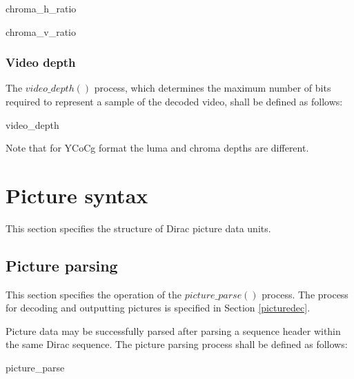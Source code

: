 \begin{pseudo}{chroma\_h\_ratio}{}
\bsRET{\LumaWidth//\ChromaWidth}
\end{pseudo}
 
\begin{pseudo}{chroma\_v\_ratio}{}
\bsRET{\LumaHeight//\ChromaHeight}
\end{pseudo}

\subsubsection{Video depth}
\label{videodepth}
The $video\_depth()$ process, which determines the maximum number of bits required to represent a sample of the decoded video, shall be defined as follows:

\begin{pseudo}{video\_depth}{\VideoParams}
\end{pseudo}

Note that for YCoCg format the luma and chroma depths are different.

\section{Picture syntax}
\label{picturesyntax}
This section specifies the structure of Dirac picture data units.

\subsection{Picture parsing}
\label{picture}
\label{pictureparse}

This section specifies the operation of the $picture\_parse()$ process. The process for
decoding and outputting pictures is specified in Section \ref{picturedec}.

Picture data may be successfully parsed after parsing a sequence header within the 
same  Dirac sequence. The picture parsing process shall be defined as follows:

\begin{pseudo}{picture\_parse}{}
\bsEND
{}
\end{pseudo}

